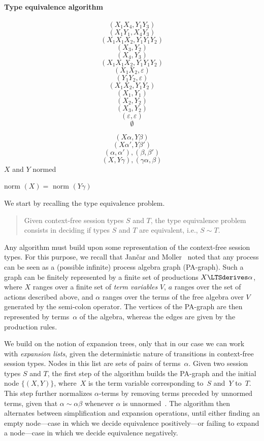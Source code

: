 \paragraph{Type equivalence algorithm}
\label{sec:algorithm}

$$(X_1X_4, Y_1Y_3)$$
$$(X_1Y_1,X_4Y_3)$$
$$(X_1X_1X_2,Y_1Y_1Y_2)$$
$$(X_3,Y_2)$$
$$(X_4,Y_3)$$
$$(X_1X_1X_2,Y_1Y_1Y_2)$$
$$(X_1X_2,\varepsilon)$$
$$(Y_1Y_2,\varepsilon)$$
$$(X_1X_2,Y_1Y_2)$$
$$(X_1,Y_1)$$
$$(X_2,Y_2)$$
$$(X_3,Y_2)$$
$$(\varepsilon,\varepsilon)$$
$$\emptyset$$

$$(X\alpha, Y\beta)$$
$$(X\alpha', Y\beta')$$
$$(\alpha, \alpha'), (\beta,\beta')$$
$$(X,Y\gamma), (\gamma \alpha, \beta)$$
$X$ and $Y$ normed

norm $(X)=$ norm $(Y\gamma)$




We start by recalling the type equivalence problem.

\begin{quote}
  Given context-free session types $S$ and $T$, the type equivalence
  problem consists in deciding if types $S$ and $T$ are equivalent,
  i.e., $S\sim T$.
\end{quote}

Any algorithm must build upon some representation of the context-free
session types. For this purpose, we recall that Jan{\v{c}}ar and
Moller~\cite{janvcar1999techniques} noted that any process can be seen
as a (possible infinite) process algebra graph (PA-graph).  Such a
graph can be finitely represented by a finite set of productions
$X \LTSderives \alpha$, where $X$ ranges over a finite set of
\emph{term variables} $V$, $a$ ranges over the set of actions
described above, and $\alpha$ ranges over the terms of the free
algebra over $V$ generated by the semi-colon operator.
The vertices of the PA-graph are then represented by terms~$\alpha$ of
the algebra, whereas the edges are given by the production rules.

We build on the notion of expansion trees, only that in our case we
can work with \emph{expansion lists}, given the deterministic nature
of transitions in context-free session types.
%
Nodes in this list are sets of pairs of terms~$\alpha$.
%
Given two session types $S$ and $T$, the first step of the algorithm
builds the PA-graph and the initial node $\{(X,Y)\}$, where~$X$ is the
term variable corresponding to~$S$ and~$Y$ to~$T$. This step further
normalizes $\alpha$-terms by removing terms preceded by unnormed
terms, given that $\alpha \sim \alpha\beta$ whenever $\alpha$ is
unnormed~\cite{janvcar1999techniques}.
%
The algorithm then alternates between simplification and expansion
operations, until either finding an empty node---case in which we
decide equivalence positively---or failing to expand a node---case in
which we decide equivalence negatively.

